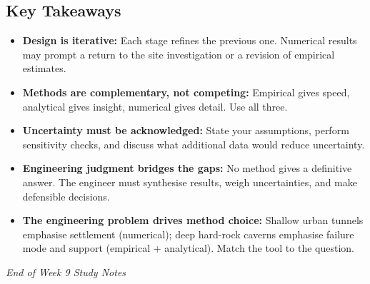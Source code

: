\documentclass[a4paper,12pt]{article}
\begin{document}
\subsection{Key Takeaways}
\begin{itemize}
    \item \textbf{Design is iterative:} Each stage refines the previous one. Numerical results may prompt a return to the site investigation or a revision of empirical estimates.
    \item \textbf{Methods are complementary, not competing:} Empirical gives speed, analytical gives insight, numerical gives detail. Use all three.
    \item \textbf{Uncertainty must be acknowledged:} State your assumptions, perform sensitivity checks, and discuss what additional data would reduce uncertainty.
    \item \textbf{Engineering judgment bridges the gaps:} No method gives a definitive answer. The engineer must synthesise results, weigh uncertainties, and make defensible decisions.
    \item \textbf{The engineering problem drives method choice:} Shallow urban tunnels emphasise settlement (numerical); deep hard-rock caverns emphasise failure mode and support (empirical + analytical). Match the tool to the question.
\end{itemize}


\vspace{1cm}
\noindent\textit{End of Week 9 Study Notes}
\end{document}
